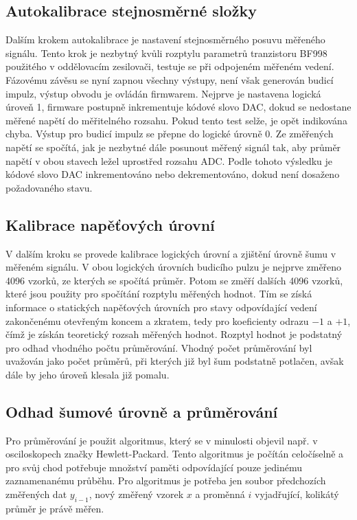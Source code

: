 \subsection{Autokalibrace stejnosměrné složky}
Dalším krokem autokalibrace je nastavení stejnosměrného posuvu měřeného signálu. Tento krok je nezbytný kvůli rozptylu parametrů tranzistoru BF998 použitého v oddělovacím zesilovači, testuje se při odpojeném měřeném vedení. Fázovému závěsu se nyní zapnou všechny výstupy, není však generován budicí impulz, výstup obvodu je ovládán firmwarem. Nejprve je nastavena logická úroveň 1, firmware postupně inkrementuje kódové slovo \acrshort{DAC}, dokud se nedostane měřené napětí do měřitelného rozsahu. Pokud tento test selže, je opět indikována chyba. Výstup pro budicí impulz se přepne do logické úrovně 0. Ze změřených napětí se spočítá, jak je nezbytné dále posunout měřený signál tak, aby průměr napětí v obou stavech ležel uprostřed rozsahu ADC. Podle tohoto výsledku je kódové slovo DAC inkrementováno nebo dekrementováno, dokud není dosaženo požadovaného stavu.

\subsection{Kalibrace napěťových úrovní}
V dalším kroku se provede kalibrace logických úrovní a zjištění úrovně šumu v měřeném signálu. V obou logických úrovních budicího pulzu je nejprve změřeno 4096 vzorků, ze kterých se spočítá průměr. Potom se změří dalších 4096 vzorků, které jsou použity pro spočítání rozptylu měřených hodnot. Tím se získá informace o statických napěťových úrovních pro stavy odpovídající vedení zakončenému otevřeným koncem a zkratem, tedy pro koeficienty odrazu $-1$ a $+1$, čímž je získán teoretický rozsah měřených hodnot. Rozptyl hodnot je podstatný pro odhad vhodného počtu průměrování. Vhodný počet průměrování byl uvažován jako počet průměrů, při kterých již byl šum podstatně potlačen, avšak dále by jeho úroveň klesala již pomalu.

\subsection{Odhad šumové úrovně a průměrování}
Pro průměrování je použit algoritmus, který se v minulosti objevil např. v osciloskopech značky Hewlett-Packard. Tento algoritmus je počítán celočíselně a pro svůj chod potřebuje množství paměti odpovídající pouze jedinému zaznamenanému průběhu. Pro algoritmus je potřeba jen soubor předchozích změřených dat $ y_{i-1}$, nový změřený vzorek $x$ a proměnná $i$ vyjadřující, kolikátý průměr je právě měřen.

